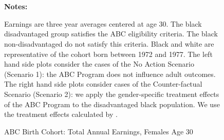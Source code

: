 \begin{figure} \begin{center}\centering
        \caption{ABC Birth Cohort: Total Annual Earnings, Females Age 30}
        \label{female_earn_decile_abc}\vspace{0.2cm}
          \\
          \\     
\end{center}
{\scriptsize {\bfseries Notes: } \raggedright Earnings are three year averages centered at age 30. The black disadvantaged group satisfies the ABC eligibility criteria. The black non-disadvantaged do not satisfy this criteria. Black and white are representative of the cohort born between 1972 and 1977. The left hand side plots consider the cases of the No Action Scenario (Scenario 1): the ABC Program does not influence adult outcomes. The right hand side plots consider cases of the Counter-factual Scenario (Scenario 2): we apply the gender-specific treatment effects of the ABC Program to the disadvantaged black population. We use the treatment effects calculated by \citet{Frances_2013_EJ}.
}
\end{figure}


